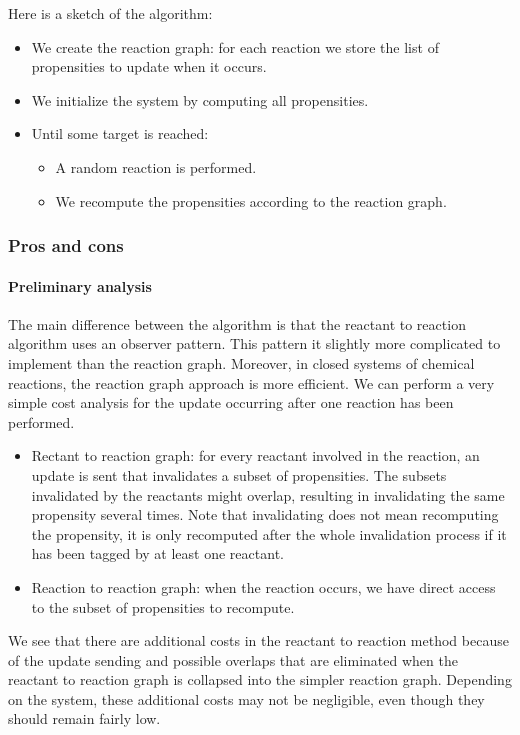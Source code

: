 Here is a sketch of the algorithm:
\begin{itemize}
  \item We create the reaction graph: for each reaction we store the list of propensities to update when it occurs.
  \item We initialize the system by computing all propensities.
  \item Until some target is reached:
    \begin{itemize}
      \item A random reaction is performed.
      \item We recompute the propensities according to the reaction graph.
    \end{itemize}
\end{itemize}

\subsubsection{Pros and cons}

\paragraph{Preliminary analysis} The main difference between the algorithm is that the reactant to reaction algorithm uses an observer pattern. This pattern it slightly more complicated to implement than the reaction graph. Moreover, in closed systems of chemical reactions, the reaction graph approach is more efficient. We can perform a very simple cost analysis for the update occurring after one reaction has been performed.

\begin{itemize}
  \item Rectant to reaction graph: for every reactant involved in the reaction, an update is sent that invalidates a subset of propensities. The subsets invalidated by the reactants might overlap, resulting in invalidating the same propensity several times. Note that invalidating does not mean recomputing the propensity, it is only recomputed after the whole invalidation process if it has been tagged by at least one reactant.
  \item Reaction to reaction graph: when the reaction occurs, we have direct access to the subset of propensities to recompute.
\end{itemize}

We see that there are additional costs in the reactant to reaction method because of the update sending and possible overlaps that are eliminated when the reactant to reaction graph is collapsed into the simpler reaction graph. Depending on the system, these additional costs may not be negligible, even though they should remain fairly low.

